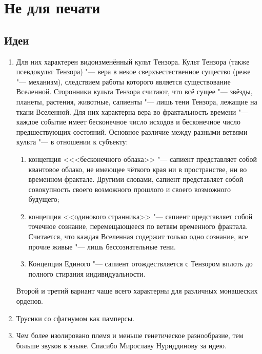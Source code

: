 \chapter{Не для печати}

\section{Идеи}

\begin{enumerate}

\item Для них характерен видоизменённый культ Тензора.
Культ Тензора (также псевдокульт Тензора) "--- вера в некое сверхъестественное существо (реже "--- механизм), следствием работы которого является существование Вселенной.
Сторонники культа Тензора считают, что всё сущее "--- звёзды, планеты, растения, животные, сапиенты "--- лишь тени Тензора, лежащие на ткани Вселенной.
Для них характерна вера во фрактальность времени "--- каждое событие имеет бесконечное число исходов и бесконечное число предшествующих состояний.
Основное различие между разными ветвями культа "--- в отношении к субъекту:

\begin{enumerate}
\item концепция <<<бесконечного облака>> "--- сапиент представляет собой квантовое облако, не имеющее чёткого края ни в пространстве, ни во временном фрактале.
Другими словами, сапиент представляет собой совокупность своего возможного прошлого и своего возможного будущего;
\item концепция <<одинокого странника>> "--- сапиент представляет собой точечное сознание, перемещающееся по ветвям временного фрактала.
Считается, что каждая Вселенная содержит только одно сознание, все прочие живые "--- лишь бессознательные тени.
\item Концепция Единого "--- сапиент отождествляется с Тензором вплоть до полного стирания индивидуальности.                                                                                                            \end{enumerate}

Второй и третий вариант чаще всего характерны для различных монашеских орденов.

\item Трусики со сфагнумом как памперсы.

\item Чем более изолировано племя и меньше генетическое разнообразие, тем больше звуков в языке.
Спасибо Мирославу Нуриддинову за идею.


\end{enumerate}
